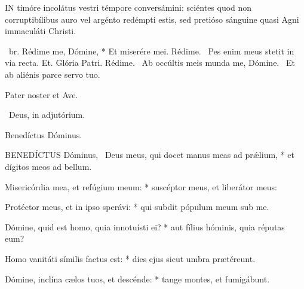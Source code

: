 



\lettrine[lines=2]{I}{N} timóre incolátus vestri témpore conversámini: sciéntes quod non corruptibílibus auro vel argénto redémpti estis, sed pretióso sánguine quasi Agni immaculáti Christi.

\R\ br. Rédime me, Dómine, * Et miserére mei. Rédime. \V\ Pes enim meus stetit in via recta. Et. Glória Patri. Rédime. \V\ Ab occúltis meis munda me, Dómine. \R\ Et ab aliénis parce servo tuo.



\sectionornament


Pater noster et Ave.

\V\ Deus, in adjutórium.


  Benedíctus Dóminus. \dag



\lettrine[lines=2]{B}{ENEDÍCTUS} Dóminus, \dag\ Deus meus, qui docet manus meas ad prǽlium, * et dígitos meos ad bellum.

Misericórdia mea, et refúgium meum: * suscéptor meus, et liberátor meus:

Protéctor meus, et in ipso sperávi: * qui subdit pópulum meum sub me.

Dómine, quid est homo, quia innotuísti ei? * aut fílius hóminis, quia réputas eum?

Homo vanitáti símilis factus est: * dies ejus sicut umbra prætéreunt.

Dómine, inclína cælos tuos, et descénde: * tange montes, et fumigábunt.

